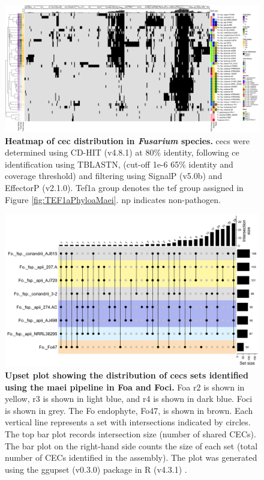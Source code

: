 \begin{figure}
    \centering
    \includegraphics[width=\textwidth]{Figures/EffectorsHeatmap.png}
    \captionsetup{width=24cm}
    \caption[Heatmap of \acl{cec}s distribution in \textit{Fusarium} species.]{\textbf{Heatmap of \acf{cec} distribution in \textit{Fusarium} species.} \Acp{cec} were determined using CD-HIT (v4.8.1) at 80\% identity, following \ac{ce} identification using TBLASTN, (cut-off 1e-6 65\% identity and coverage threshold) and filtering using SignalP (v5.0b) and EffectorP (v2.1.0). Tef1a group denotes the \ac{tef} group assigned in Figure \ref{fig:TEF1aPhyloaMaei}. np indicates non-pathogen.}
    \label{fig:MaeiHeatmap}
\end{figure}


\begin{figure}
    \centering
    \includegraphics[width=\textwidth]{Figures/UpSetCECofApii.png}
    \captionsetup{width = 22cm}
    \caption[Upset plot of \ac{cec} distribution between \ac{Foa} and \ac{Foci}.]{\textbf{Upset plot showing the distribution of \acp{cec} sets identified using the \ac{maei} pipeline in \ac{Foa} and \ac{Foci}.} \ac{Foa} \ac{r2} is shown in yellow, \ac{r3} is shown in light blue,  and \ac{r4} is shown in dark blue. \ac{Foci} is shown in grey. The \ac{Fo} endophyte, Fo47, is shown in brown. Each vertical line represents a set with intersections indicated by circles. The top bar plot records intersection size (number of shared CECs). The bar plot on the right-hand side counts the size of each set (total number of CECs identified in the assembly). The plot was generated using the ggupset (v0.3.0) \parencite{ggupset} package in R (v4.3.1) \parencite{R}.}
    \label{fig:UpSetCECofFoa}
\end{figure}

